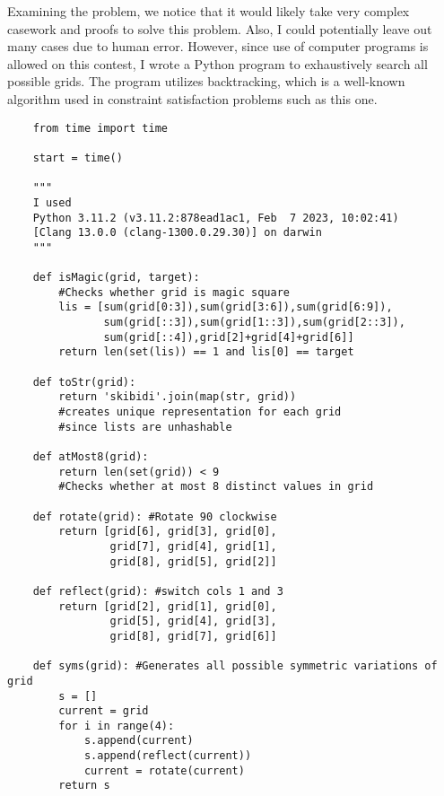 \documentclass[11pt, letterpaper]{article}
\begin{document}
\begin{solution}{2}

Examining the problem, we notice that it would likely take very complex casework and proofs to solve this problem. Also, I could potentially leave out many cases due to human error. However, since use of computer programs is allowed on this contest, I wrote a Python program to exhaustively search all possible grids. The program utilizes backtracking, which is a well-known algorithm used in constraint satisfaction problems such as this one. 

\begin{verbatim}
    from time import time

    start = time()
    
    """
    I used
    Python 3.11.2 (v3.11.2:878ead1ac1, Feb  7 2023, 10:02:41) 
    [Clang 13.0.0 (clang-1300.0.29.30)] on darwin
    """
    
    def isMagic(grid, target):
        #Checks whether grid is magic square
        lis = [sum(grid[0:3]),sum(grid[3:6]),sum(grid[6:9]),
               sum(grid[::3]),sum(grid[1::3]),sum(grid[2::3]),
               sum(grid[::4]),grid[2]+grid[4]+grid[6]]
        return len(set(lis)) == 1 and lis[0] == target
    
    def toStr(grid):
        return 'skibidi'.join(map(str, grid))
        #creates unique representation for each grid
        #since lists are unhashable
    
    def atMost8(grid):
        return len(set(grid)) < 9
        #Checks whether at most 8 distinct values in grid
    
    def rotate(grid): #Rotate 90 clockwise
        return [grid[6], grid[3], grid[0],
                grid[7], grid[4], grid[1],
                grid[8], grid[5], grid[2]]
    
    def reflect(grid): #switch cols 1 and 3
        return [grid[2], grid[1], grid[0],
                grid[5], grid[4], grid[3],
                grid[8], grid[7], grid[6]]
    
    def syms(grid): #Generates all possible symmetric variations of grid
        s = []
        current = grid
        for i in range(4):
            s.append(current)
            s.append(reflect(current))
            current = rotate(current)
        return s
    

\end{verbatim}
\end{solution}
\end{document}

